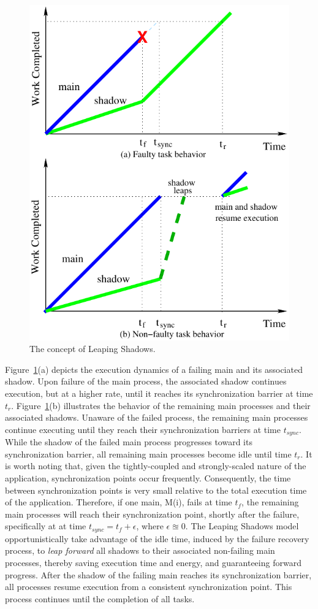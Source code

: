 \begin{figure}[!t]
	\begin{center}
			\includegraphics[width=0.8\columnwidth]{Figures/jump.pdf}
	\end{center}
	\caption{The concept of Leaping Shadows.}
	\label{fig:leap}
\end{figure}

Figure~\ref{fig:leap}(a) depicts the execution dynamics of a failing main and its associated shadow. Upon failure of the main process, the associated shadow continues execution, but at a higher rate, until it reaches its synchronization barrier at time $t_r$. 
Figure~\ref{fig:leap}(b) illustrates the behavior of the remaining main processes and their associated shadows. Unaware of the failed process, the remaining main processes continue executing until they reach their synchronization barriers at time $t_{sync}$. While the shadow of the failed main process progresses toward its synchronization barrier, all remaining main processes become idle until time $t_r$. It is worth noting that, given the tightly-coupled and strongly-scaled nature of the application, synchronization points occur frequently. Consequently, the time between synchronization points is very small relative to the total execution time of the application. Therefore, if one main, M(i), fails at 
time $t_f$, the remaining main processes will reach their synchronization point, shortly after the failure, specifically at at time $t_{sync} = t_f +\epsilon$, 
where $\epsilon \approxeq 0$. The Leaping Shadows model opportunistically take advantage of the idle time, induced by the failure recovery process, to {\it leap forward} all shadows to their associated non-failing main processes, thereby saving execution time and energy, and guaranteeing forward progress. 
After the shadow of the failing main reaches its synchronization barrier, all processes resume execution from a consistent synchronization point. This process continues until the completion of all tasks. 

